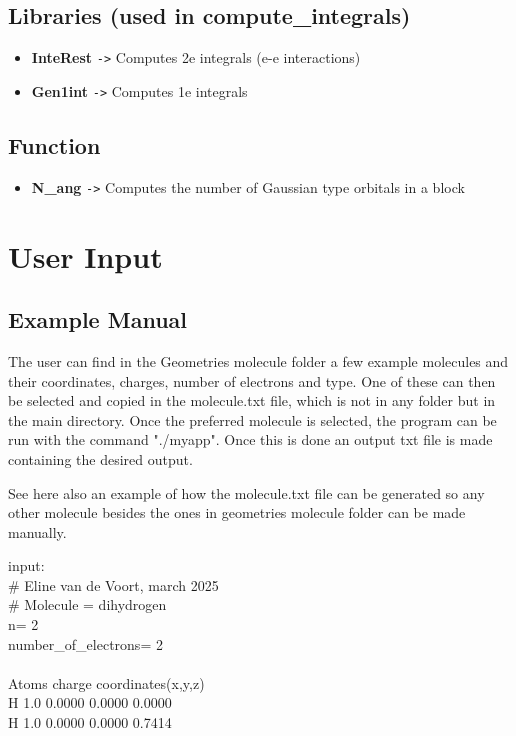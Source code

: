 \documentclass[11pt,a4paper]{article}
\begin{document}
\subsection*{Libraries (used in compute\_integrals)}
\begin{itemize}
    \item \textbf{InteRest} \texttt{->} Computes 2e integrals (e-e interactions)
    \item \textbf{Gen1int} \texttt{->} Computes 1e integrals
\end{itemize}

\subsection*{Function}
\begin{itemize}
    \item \textbf{N\_ang} \texttt{->} Computes the number of Gaussian type orbitals in a block
\end{itemize}

\section*{User Input}
\subsection*{Example Manual}
The user can find in the Geometries molecule folder a few example molecules and their coordinates, charges, number of electrons and type. One of these can then be selected and copied in the molecule.txt file, which is not in any folder but in the main directory. Once the preferred molecule is selected, the program can be run with the command "./myapp". Once this is done an output txt file is made containing the desired output. 

See here also an example of how the molecule.txt file can be generated so any other molecule besides the ones in geometries molecule folder can be made manually.

\newpage
input: \\
\# Eline van de Voort, march 2025 \\
\# Molecule = dihydrogen \\
n= 2 \\
number\_of\_electrons= 2 \\
\\
Atoms charge  coordinates(x,y,z) \\
H     1.0    0.0000	0.0000	0.0000 \\
H     1.0    0.0000	0.0000	0.7414 \\
\end{document}
